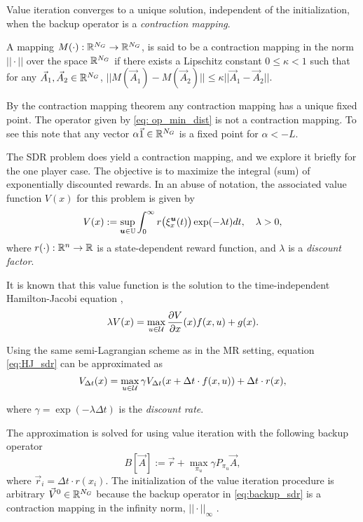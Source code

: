 Value iteration converges to a unique solution, independent of the initialization, when the backup operator is a \emph{contraction mapping}.  
%
\begin{definition} A mapping $M(\cdot): \mathbb{R}^{N_G} \rightarrow \mathbb{R}^{N_G}$, is said to be a contraction mapping in the norm $|| \cdot ||$ over the space $\mathbb{R}^{N_G}$ if there exists a Lipschitz constant $0\leq \kappa < 1$ such that for any $\vec{A}_1, \vec{A}_2 \in \mathbb{R}^{N_G}$, $||M(\vec{A}_1) - M(\vec{A}_2)|| \leq \kappa ||\vec{A}_1 - \vec{A}_2||$. 
\end{definition}

By the contraction mapping theorem any contraction mapping has a unique fixed point. The operator given by \eqref{eq: op_min_dist} is not a contraction mapping. To see this note that any vector $\alpha \vec{1} \in \mathbb{R}^{N_G}$ is a fixed point for $\alpha < -L$.

The SDR problem does yield a contraction mapping, and we explore it briefly for the one player case. The objective is to maximize the integral (sum) of exponentially discounted rewards. In an abuse of notation, the associated value function $V(x)$ for this problem is given by
%
\begin{equation}\label{eq:V_sum_rewards}
V(x) := \sup_{\bm{u} \in \mathbb{U}} \int_{0}^{\infty}r\big(\xi_{x}^{\bm{u}}(t)\big)\exp(-\lambda t) dt,  \quad \lambda >0,
\end{equation}%
\noindent where $r(\cdot):\mathbb{R}^n \rightarrow \mathbb{R}$ is a state-dependent reward function, and $\lambda$ is a \emph{discount factor}.

It is known that this value function is the solution to the time-independent Hamilton-Jacobi equation \cite{Bardi2008},
%
\begin{equation} \label{eq:HJ_sdr}
\lambda V(x) = \max_{u\in\mathcal{U}} \frac{\partial V}{\partial x}(x) f(x, u)+ g(x).
\end{equation}

Using the same semi-Lagrangian scheme as in the MR setting, equation \eqref{eq:HJ_sdr} can be approximated as
%
\begin{equation}
V_{\Delta t}(x) = \max_{u\in\mathcal{U}} \gamma V_{\Delta t}(x + \Delta t\cdot f(x, u))  + \Delta t \cdot r(x),
\end{equation}
 
\noindent where $\gamma=\exp(-\lambda \Delta t)$ is the \emph{discount rate}.

The approximation is solved for using value iteration with the following backup operator
%
\begin{equation} \label{eq:backup_sdr}
B[\vec{A}] := \vec{r} +  \underset{\pi_u}{\max} \gamma P_{\pi_u} \vec{A}, 
\end{equation}%
\noindent where $\vec{r}_i =\Delta t \cdot r(x_i)$. The initialization of the value iteration procedure is arbitrary $\vec{V}^{0} \in \mathbb{R}^{N_G}$ because the backup  operator in \eqref{eq:backup_sdr} is a contraction mapping in the infinity norm, $||\cdot||_\infty$ \cite{Bertsekas1995}.

